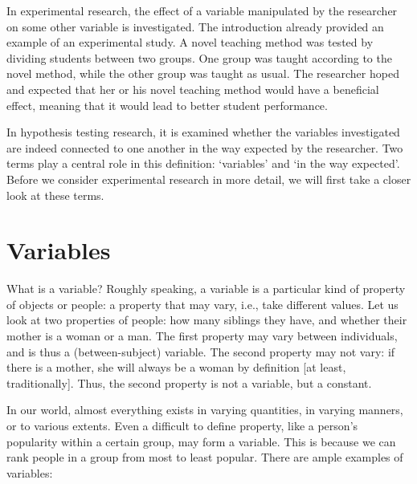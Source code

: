 \documentclass[
]{book}
\begin{document}
In experimental research, the effect of a variable manipulated by the researcher on some other variable is investigated. The introduction already provided an example of an experimental study. A novel teaching method was tested by dividing students between two groups. One group was taught according to the novel method, while the other group was taught as usual. The researcher hoped and expected that her or his novel teaching method would have a beneficial effect, meaning that it would lead to better student performance.

In hypothesis testing research, it is examined whether the variables investigated are indeed connected to one another in the way expected by the researcher. Two terms play a central role in this definition: `variables' and `in the way expected'. Before we consider experimental research in more detail, we will first take a closer look at these terms.

\hypertarget{sec:variables}{%
\section{Variables}\label{sec:variables}}

What is a variable? Roughly speaking, a variable is a particular kind of property of objects or people: a property that may vary, i.e., take different values. Let us look at two properties of people: how many siblings they have, and whether their mother is a woman or a man. The first property may vary between individuals, and is thus a (between-subject) variable. The second property may not vary: if there is a mother, she will always be a woman by definition {[}at least, traditionally{]}. Thus, the second property is not a variable, but a constant.

In our world, almost everything exists in varying quantities, in varying manners, or to various extents. Even a difficult to define property, like a person's popularity within a certain group, may form a variable. This is because we can rank people in a group from most to least popular. There are ample examples of variables:
\end{document}
